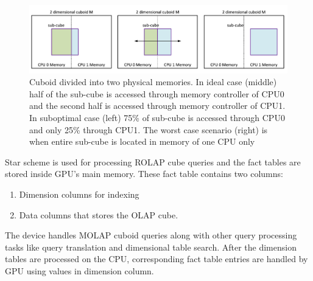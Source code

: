 \documentclass[runningheads,a4paper]{llncs}
\begin{document}
{\begin{figure}[!htb]
	\includegraphics[scale=0.7]{./images/krunal5}
	\centering
	\caption{Cuboid divided into two physical memories. In ideal case (middle) half of the sub-cube is accessed through memory controller of CPU0 and the second half is accessed through memory controller of CPU1. In suboptimal case (left) 75\% of sub-cube is accessed through CPU0 and only 25\% through CPU1. The worst case scenario (right) is when entire sub-cube is located in memory of one CPU only }
	\label{fig:Cuboid_divide}
\end{figure}

Star scheme is used for processing ROLAP cube queries and the fact tables are stored inside GPU's main memory. These fact table contains two columns:
\begin{enumerate}
	\item Dimension columns for indexing
	\item Data columns that stores the OLAP cube. 
\end{enumerate}

The device handles MOLAP cuboid queries along with other query processing tasks like query translation and dimensional table search. After the dimension tables are processed on the CPU, corresponding fact table entries are handled by GPU using values in dimension column.\\

}
\end{document}
